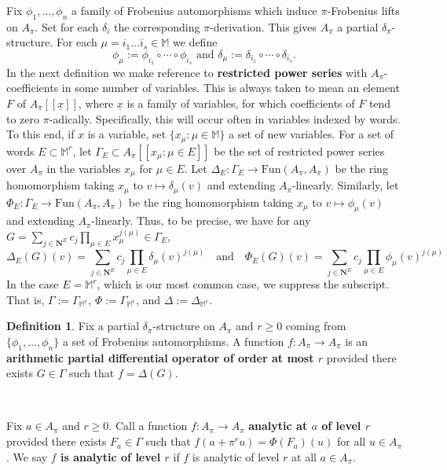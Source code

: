 \documentclass[10pt]{amsart}
\theoremstyle{Theorem}
\theoremstyle{definition}
\newtheorem{dff}[thm]{Definition}
\newcommand{\NN}{\mathbf N}
\def\ux{\underline{x}}
\begin{document}
 Fix $\phi_1,\ldots,\phi_n$ a family of Frobenius automorphisms which induce $\pi$-Frobenius lifts on $A_\pi$. Set for each $\delta_i$ the corresponding $\pi$-derivation. This gives $A_\pi$ a partial $\delta_\pi$-structure. For each $\mu = i_1 \ldots i_s \in \mathbb M$ we define 
$$\phi_\mu := \phi_{i_1} \circ \cdots \circ \phi_{i_s} \textrm{ and } \delta_\mu := \delta_{i_1} \circ \cdots \circ \delta_{i_s}.$$ 
In the next definition we make reference to {\bf restricted power series} with $A_\pi$-coefficients in some number of variables. This is always taken to mean an element $F$ of $A_\pi[[\ux]]$, where $\ux$  is a family of variables, for which coefficients of $F$ tend to zero $\pi$-adically. Specifically, this will occur often in variables indexed by words. To this end, if $x$ is a variable, set $\{ x_\mu \colon \mu \in \mathbb M\}$ a set of new variables.  For a set of words $E\subset \mathbb M ^r$, let $\Gamma_{E} \subset A_\pi[[x_\mu\colon \mu \in E]]$ be the set of restricted power series over $A_\pi$ in the variables $x_\mu$ for $\mu\in E$.  Let $\Delta_E:\Gamma_{E}\to \mathrm{Fun}(A_\pi,A_\pi)$ be the ring homomorphism taking $x_\mu$ to $v\mapsto \delta_\mu(v)$ and extending $A_\pi$-linearly.  Similarly, let $\Phi_E:\Gamma_{E}\to \mathrm{Fun}(A_\pi,A_\pi)$ be the ring homomorphism taking $x_\mu$ to $v\mapsto \phi_\mu(v)$ and extending $A_\pi$-linearly.  Thus, to be precise, we have for any $G = \sum_{j\in \NN^{E}} c_j\prod_{\mu\in E}x_\mu^{j(\mu)}\in \Gamma_{E}$,
\[
    \Delta_E(G)(v)  =  \sum_{j\in \NN^{E}} c_j\prod_{\mu\in E}\delta_\mu(v)^{j(\mu)} \quad \text{and}\quad    \Phi_E(G)(v) =  \sum_{j\in \NN^{E}} c_j\prod_{\mu\in E}\phi_\mu(v)^{j(\mu)}
\]
In the case $E = \mathbb M^r$, which is our most common case, we suppress the subscript.  That is, $\Gamma:=\Gamma_{\mathbb M^r}$, $\Phi:=\Gamma_{\mathbb M^r}$, and $\Delta :=\Delta_{\mathbb M^r}$.

\begin{dff}\label{dff1} Fix a partial $\delta_\pi$-structure on $A_\pi$ and $r \geq 0$ coming from $\{\phi_1,\ldots,\phi_n\}$ a set of Frobenius automorphisms. A function $f \colon A_\pi \to A_\pi$ is an {\bf arithmetic partial differential operator of order at most $r$} provided there exists $G\in \Gamma$ such that $f = \Delta(G)$. 

\

\noindent Fix $a \in A_\pi$ and $r \geq 0$. Call a function $f \colon A_\pi \to A_\pi$ {\bf analytic at $a$ of level $r$} provided there exists $F_a \in \Gamma$ such that $f(a + \pi^r u) = \Phi(F_a)(u)$ for all $u\in A_\pi$. We say {\bf $f$ is analytic of level $r$} if $f$ is analytic of level $r$ at all $a \in A_\pi$.
\end{dff}
\end{document}
